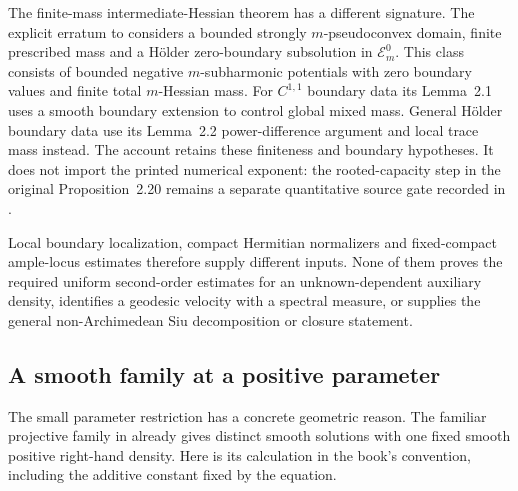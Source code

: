 The finite-mass intermediate-Hessian theorem has a different
signature. The explicit erratum
\cite[Theorem~B']{BenaliZeriahi21HolderErratumPublished} to
\cite{BenaliZeriahi20HolderSubsolutionPublished} considers a
bounded strongly $m$-pseudoconvex domain, finite prescribed mass
and a H\"older zero-boundary subsolution in $\mathcal E_m^0$.
This class consists of bounded negative $m$-subharmonic
potentials with zero boundary values and finite total
$m$-Hessian mass. For $C^{1,1}$ boundary data its Lemma~2.1
uses a smooth boundary extension to control global mixed
mass. General H\"older boundary data use its Lemma~2.2
power-difference argument and local trace mass instead.
The account retains these finiteness and boundary hypotheses.
It does not import the printed numerical exponent: the
rooted-capacity step in the original Proposition~2.20 remains
a separate quantitative source gate recorded in
.

Local boundary localization, compact Hermitian normalizers
and fixed-compact ample-locus estimates therefore supply
different inputs. None of them proves the required uniform
second-order estimates for an unknown-dependent auxiliary
density, identifies a geodesic velocity with a spectral
measure, or supplies the general non-Archimedean Siu
decomposition or closure statement.

\subsection{A smooth family at a positive parameter}
\label{sec:ytd-meanfield-projective-family}

The small parameter restriction has a concrete geometric reason.
The familiar projective family in
\cite[Example~3.5]{LuPhung25MeanFieldV1} already gives distinct
smooth solutions with one fixed smooth positive right-hand density.
Here is its calculation in the book's convention, including the
additive constant fixed by the equation.

